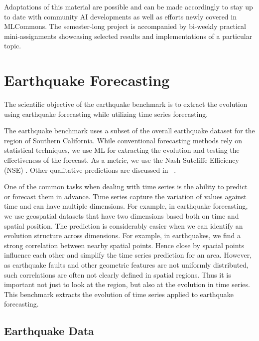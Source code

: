 \documentclass[utf8]{FrontiersinVancouver} %
\begin{document}
{\begin{enumerate}
 \end{enumerate}

 Adaptations of this material are possible and can be made accordingly
 to stay up to date with community AI developments as well as efforts
 newly covered in MLCommons. The semester-long project is accompanied
 by bi-weekly practical mini-assignments showcasing selected results
 and implementations of a particular topic.

\section{Earthquake Forecasting}
\label{sec:eq}

The scientific objective of the earthquake benchmark is to extract the
evolution using earthquake forecasting while utilizing time series
forecasting.

The earthquake benchmark uses a subset of the overall earthquake
dataset for the region of Southern California. While conventional
forecasting methods rely on statistical techniques, we use ML for
extracting the evolution and testing the effectiveness of the
forecast.  As a metric, we use the Nash-Sutcliffe Efficiency (NSE)
\citep{nash-79}.  Other qualitative predictions are discussed in
~\citep{fox2022-jm}.

One of the common tasks when dealing with time series is the ability
to predict or forecast them in advance. Time series capture the
variation of values against time and can have multiple dimensions. For
example, in earthquake forecasting, we use geospatial datasets that
have two dimensions based both on time and spatial position. The
prediction is considerably easier when we can identify an evolution
structure across dimensions. For example, in earthquakes, we find a
strong correlation between nearby spatial points. Hence close by
spacial points influence each other and simplify the time series
prediction for an area. However, as earthquake faults and other
geometric features are not uniformly distributed, such correlations
are often not clearly defined in spatial regions. Thus it is important
not just to look at the region, but also at the evolution in time
series. This benchmark extracts the evolution of time series applied
to earthquake forecasting.


\subsection{Earthquake Data}

}
\end{document}

